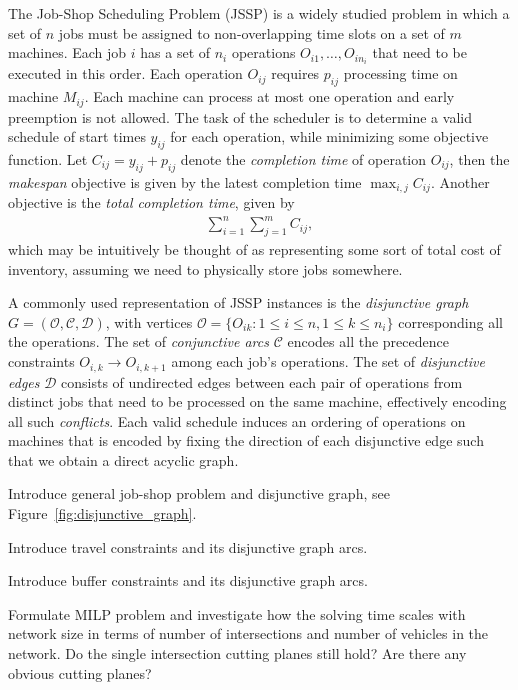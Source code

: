 \documentclass[a4paper]{article}
\theoremstyle{definition}
\theoremstyle{plain}
\begin{document}
The Job-Shop Scheduling Problem (JSSP) is a widely studied problem in which a
set of $n$ jobs must be assigned to non-overlapping time slots on a set of $m$
machines. Each job $i$ has a set of $n_{i}$ operations
$O_{i1}, \dots, O_{in_{i}}$ that need to be executed in this order. Each
operation $O_{ij}$ requires $p_{ij}$ processing time on machine $M_{ij}$. Each
machine can process at most one operation and early preemption is not allowed.
The task of the scheduler is to determine a valid schedule of start times
$y_{ij}$ for each operation, while minimizing some objective function. Let
$C_{ij} = y_{ij} + p_{ij}$ denote the \textit{completion time} of operation
$O_{ij}$, then the \textit{makespan} objective is given by the latest completion
time $\max_{i,j} C_{ij}$. Another objective is the \textit{total completion
  time}, given by
\begin{align*}
  \sum_{i=1}^{n} \sum_{j=1}^{m} C_{ij} ,
\end{align*}
which may be intuitively be thought of as representing some sort of total cost
of inventory, assuming we need to physically store jobs somewhere.

A commonly used representation of JSSP instances is the \textit{disjunctive
  graph} $G = (\mathcal{O}, \mathcal{C}, \mathcal{D})$, with vertices
$\mathcal{O} = \{ O_{ik} : 1 \leq i \leq n, 1 \leq k \leq n_{i} \}$
corresponding all the operations. The set of \textit{conjunctive arcs}
$\mathcal{C}$ encodes all the precedence constraints
$O_{i,k} \rightarrow O_{i,k+1} $ among each job's operations. The set of
\textit{disjunctive edges} $\mathcal{D}$ consists of undirected edges between
each pair of operations from distinct jobs that need to be processed on the same
machine, effectively encoding all such \textit{conflicts}. Each valid schedule
induces an ordering of operations on machines that is encoded by fixing the
direction of each disjunctive edge such that we obtain a direct acyclic graph.

\begin{itemize}
  \renewcommand\labelitemi{--}
{\color{gray}
\item Introduce general job-shop problem and disjunctive graph, see Figure~\ref{fig:disjunctive_graph}.
\item Introduce travel constraints and its disjunctive graph arcs.
\item Introduce buffer constraints and its disjunctive graph arcs.

\item Formulate MILP problem and investigate how the solving time scales with network
size in terms of number of intersections and number of vehicles in the network.
Do the single intersection cutting planes still hold? Are there any obvious
cutting planes?
}
\end{itemize}
\end{document}
